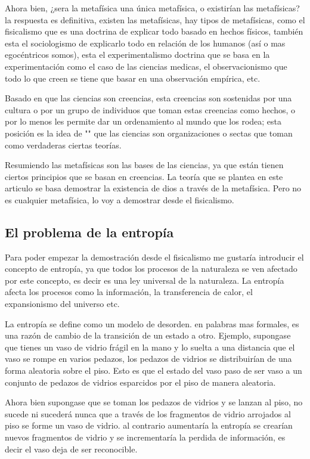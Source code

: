 \documentclass[12pt,letterpaper, a4paper ]{article}
\begin{document}
 Ahora bien, ¿sera la metafísica una única metafísica, o existirían las metafísicas? la respuesta es definitiva, existen las metafísicas, hay tipos de metafísicas, como el fisicalismo que es una doctrina de explicar todo basado en hechos físicos, también esta el sociologismo de explicarlo todo en relación de los humanos (así o mas egocéntricos somos), esta el experimentalismo doctrina que se basa en la experimentación como el caso de las ciencias medicas, el observacionismo que todo lo que creen se tiene que basar en una observación empírica, etc.
 
 Basado en que las ciencias son creencias, esta creencias son sostenidas por una cultura o por un grupo de individuos que toman estas creencias como hechos, o por lo menos les permite dar un ordenamiento al mundo que los rodea; esta posición es la idea de "" que las ciencias son organizaciones o sectas que toman como verdaderas ciertas teorías.
 
 Resumiendo las metafísicas son las bases de las ciencias, ya que están tienen ciertos principios que se basan en creencias. La teoría que se plantea en este articulo se basa demostrar la existencia de dios a través de la metafísica. Pero no es cualquier metafísica, lo voy a demostrar desde el fisicalismo.
 

\subsection{El problema de la entropía}

Para poder empezar la demostración desde el fisicalismo me gustaría introducir el concepto de entropía, ya que todos los procesos de la naturaleza se ven afectado por este concepto, es decir es una ley universal de la naturaleza. La entropía afecta los procesos como la información, la transferencia de calor, el expansionismo del universo etc.

La entropía se define como un modelo de desorden. en palabras mas formales, es una razón de cambio de la transición de un estado a otro. Ejemplo, supongase que tienes un vaso de vidrio frágil en la mano y lo suelta a una distancia que el vaso se rompe en varios pedazos, los pedazos de vidrios se distribuirían de una forma aleatoria sobre el piso. Esto es que el estado del vaso paso de ser vaso a un conjunto de pedazos de vidrios esparcidos por el piso de manera aleatoria.

Ahora bien supongase que se toman los pedazos de vidrios y se lanzan al piso, no sucede ni sucederá nunca que a través de los fragmentos de vidrio arrojados al piso se forme un vaso de vidrio. al contrario aumentaría la entropía se crearían nuevos fragmentos de vidrio y se incrementaría la perdida de información, es decir el vaso deja de ser reconocible.
\end{document}
